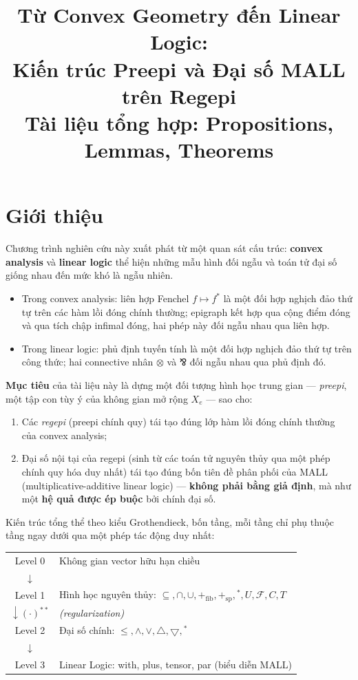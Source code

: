 \documentclass[11pt]{article}
\title{Từ Convex Geometry đến Linear Logic:\\
Kiến trúc Preepi và Đại số MALL trên Regepi\\
\large Tài liệu tổng hợp: Propositions, Lemmas, Theorems}
\author{}
\date{}
\theoremstyle{plainlabel}
\begin{document}
\maketitle

\tableofcontents

\section{Giới thiệu}

Chương trình nghiên cứu này xuất phát từ một quan sát cấu trúc: \textbf{convex analysis} và \textbf{linear logic} thể hiện những mẫu hình đối ngẫu và toán tử đại số giống nhau đến mức khó là ngẫu nhiên.

\begin{itemize}
\item Trong convex analysis: liên hợp Fenchel $f\mapsto f^*$ là một đối hợp nghịch đảo thứ tự trên các hàm lồi đóng chính thường; epigraph kết hợp qua cộng điểm đóng và qua tích chập infimal đóng, hai phép này đối ngẫu nhau qua liên hợp.
\item Trong linear logic: phủ định tuyến tính là một đối hợp nghịch đảo thứ tự trên công thức; hai connective nhân $\otimes$ và $⅋$ đối ngẫu nhau qua phủ định đó.
\end{itemize}

\textbf{Mục tiêu} của tài liệu này là dựng một đối tượng hình học trung gian — \emph{preepi}, một tập con tùy ý của không gian mở rộng $X_e$ — sao cho:
\begin{enumerate}
\item Các \emph{regepi} (preepi chính quy) tái tạo đúng lớp hàm lồi đóng chính thường của convex analysis;
\item Đại số nội tại của regepi (sinh từ các toán tử nguyên thủy qua một phép chính quy hóa duy nhất) tái tạo đúng bốn tiên đề phân phối của MALL (multiplicative-additive linear logic) — \textbf{không phải bằng giả định}, mà như một \textbf{hệ quả được ép buộc} bởi chính đại số.
\end{enumerate}

Kiến trúc tổng thể theo kiểu Grothendieck, bốn tầng, mỗi tầng chỉ phụ thuộc tầng ngay dưới qua một phép tác động duy nhất:

\begin{center}
\begin{tabular}{cl}
Level 0 & Không gian vector hữu hạn chiều \\
$\downarrow$ & \\
Level 1 & Hình học nguyên thủy: $\subseteq,\cap,\cup,+_{\mathrm{fib}},+_{\mathrm{sp}},{}^*,U,\mathcal F,C,T$ \\
$\downarrow (\cdot)^{**}$ & \emph{(regularization)} \\
Level 2 & Đại số chính: $\le,\wedge,\vee,\triangle,\bigtriangledown,{}^*$ \\
$\downarrow$ & \\
Level 3 & Linear Logic: with, plus, tensor, par (biểu diễn MALL) \\
\end{tabular}
\end{center}
\end{document}
